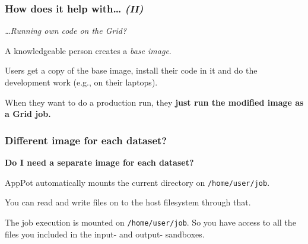 \documentclass{beamer}
\begin{document}
\begin{frame}
  \frametitle{How does it help with\ldots{} \emph{(II)}}
  \label{sec:11}
  
  \emph{\ldots Running own code on the Grid?}

  \+
  A knowledgeable person creates a \emph{base image}.
  
  \+
  Users get a copy of the base image, install their code in it and do
  the development work (e.g., on their laptops).
  
  \+
  When they want to do a production run, 
  they \textbf{just run the modified image as a Grid job.}
\end{frame}


  



\begin{frame}
  \frametitle{Different image for each dataset?}
  \label{sec:14}
  \textbf{Do I need a separate image for each dataset?}
  
  \+
  AppPot automatically mounts the current directory on \texttt{/home/user/job}.  

  \+
  You can read and write files on to the host filesystem through that.

  \+
  The job execution is mounted on \texttt{/home/user/job}.
  So you have access to all the files you included in the input- and
  output- sandboxes.
\end{frame}
\end{document}
